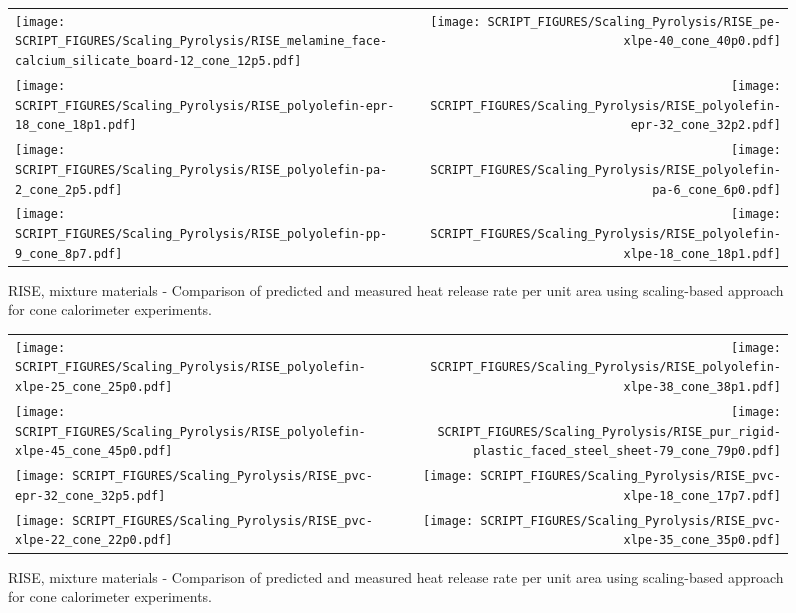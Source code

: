 \begin{figure}[p]
\begin{tabular*}{\textwidth}{l@{\extracolsep{\fill}}r}
\texttt{[image: SCRIPT\_FIGURES/Scaling\_Pyrolysis/RISE\_melamine\_face-calcium\_silicate\_board-12\_cone\_12p5.pdf]} &
\texttt{[image: SCRIPT\_FIGURES/Scaling\_Pyrolysis/RISE\_pe-xlpe-40\_cone\_40p0.pdf]} \\
\texttt{[image: SCRIPT\_FIGURES/Scaling\_Pyrolysis/RISE\_polyolefin-epr-18\_cone\_18p1.pdf]} &
\texttt{[image: SCRIPT\_FIGURES/Scaling\_Pyrolysis/RISE\_polyolefin-epr-32\_cone\_32p2.pdf]} \\
\texttt{[image: SCRIPT\_FIGURES/Scaling\_Pyrolysis/RISE\_polyolefin-pa-2\_cone\_2p5.pdf]} &
\texttt{[image: SCRIPT\_FIGURES/Scaling\_Pyrolysis/RISE\_polyolefin-pa-6\_cone\_6p0.pdf]} \\
\texttt{[image: SCRIPT\_FIGURES/Scaling\_Pyrolysis/RISE\_polyolefin-pp-9\_cone\_8p7.pdf]} &
\texttt{[image: SCRIPT\_FIGURES/Scaling\_Pyrolysis/RISE\_polyolefin-xlpe-18\_cone\_18p1.pdf]} \\
\end{tabular*}
\caption[HRRPUA of RISE Materials using scaling model, mixtures materials]
{RISE, mixture materials - Comparison of predicted and measured heat release rate per unit area using scaling-based approach for cone calorimeter experiments.}
\label{RISE_Materials_HRR_Mixtures2}
\end{figure}

\begin{figure}[p]
\begin{tabular*}{\textwidth}{l@{\extracolsep{\fill}}r}
\texttt{[image: SCRIPT\_FIGURES/Scaling\_Pyrolysis/RISE\_polyolefin-xlpe-25\_cone\_25p0.pdf]} &
\texttt{[image: SCRIPT\_FIGURES/Scaling\_Pyrolysis/RISE\_polyolefin-xlpe-38\_cone\_38p1.pdf]} \\
\texttt{[image: SCRIPT\_FIGURES/Scaling\_Pyrolysis/RISE\_polyolefin-xlpe-45\_cone\_45p0.pdf]} &
\texttt{[image: SCRIPT\_FIGURES/Scaling\_Pyrolysis/RISE\_pur\_rigid-plastic\_faced\_steel\_sheet-79\_cone\_79p0.pdf]} \\
\texttt{[image: SCRIPT\_FIGURES/Scaling\_Pyrolysis/RISE\_pvc-epr-32\_cone\_32p5.pdf]} &
\texttt{[image: SCRIPT\_FIGURES/Scaling\_Pyrolysis/RISE\_pvc-xlpe-18\_cone\_17p7.pdf]} \\
\texttt{[image: SCRIPT\_FIGURES/Scaling\_Pyrolysis/RISE\_pvc-xlpe-22\_cone\_22p0.pdf]} &
\texttt{[image: SCRIPT\_FIGURES/Scaling\_Pyrolysis/RISE\_pvc-xlpe-35\_cone\_35p0.pdf]} \\
\end{tabular*}
\caption[HRRPUA of RISE Materials using scaling model, mixtures materials]
{RISE, mixture materials - Comparison of predicted and measured heat release rate per unit area using scaling-based approach for cone calorimeter experiments.}
\label{RISE_Materials_HRR_Mixtures3}
\end{figure}

